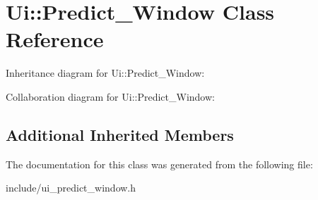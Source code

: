 \hypertarget{class_ui_1_1_predict___window}{}\section{Ui\+:\+:Predict\+\_\+\+Window Class Reference}
\label{class_ui_1_1_predict___window}


Inheritance diagram for Ui\+:\+:Predict\+\_\+\+Window\+:


Collaboration diagram for Ui\+:\+:Predict\+\_\+\+Window\+:
\subsection*{Additional Inherited Members}


The documentation for this class was generated from the following file\+:\begin{DoxyCompactItemize}
\item 
include/ui\+\_\+predict\+\_\+window.\+h\end{DoxyCompactItemize}
